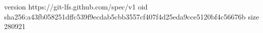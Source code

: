 version https://git-lfs.github.com/spec/v1
oid sha256:a43fb058251dffc539f9ecdab5cbb3557cf407f4d25eda9cce5120bf4c56676b
size 280921
